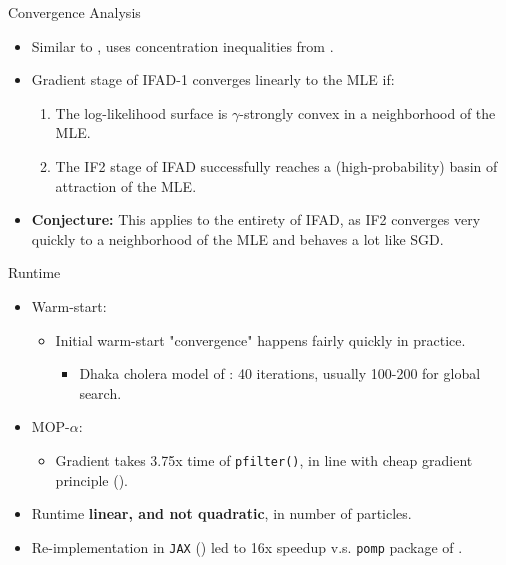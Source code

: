 \documentclass{beamer}
\begin{document}
\begin{frame}{Convergence Analysis}
    \begin{itemize}
        \item Similar to \cite{mahoney16}, uses concentration inequalities from \cite{delmoral2011ci}.
        \item Gradient stage of IFAD-1 converges linearly to the MLE if:
        \begin{enumerate}
            \item \pause The log-likelihood surface is $\gamma$-strongly convex in a neighborhood of the MLE.
            \item \pause The IF2 stage of IFAD successfully reaches a (high-probability) basin of attraction of the MLE. 
        \end{enumerate}
        \item \pause \textbf{Conjecture:} This applies to the entirety of IFAD, as IF2 converges very quickly to a neighborhood of the MLE and behaves a lot like SGD. 
    \end{itemize}
    
\end{frame}


\begin{frame}{Runtime}

\begin{itemize}
    \item Warm-start:
    \begin{itemize}
        \item \pause Initial warm-start "convergence" happens fairly quickly in practice. 
        \begin{itemize}
            \item \pause Dhaka cholera model of \cite{king08}: 40 iterations, usually 100-200 for global search.
        \end{itemize}
    \end{itemize}
    \item \pause MOP-$\alpha$:
    \begin{itemize}
        \item \pause Gradient takes 3.75x time of \texttt{pfilter()}, in line with cheap gradient principle (\cite{kakade2019provably}).
    \end{itemize}
    \item \pause Runtime \textbf{linear, and not quadratic}, in number of particles.
    \item \pause Re-implementation in \texttt{JAX} (\cite{jax2018github}) led to 16x speedup v.s. \texttt{pomp} package of \cite{king08}.
\end{itemize}

\end{frame}
\end{document}
